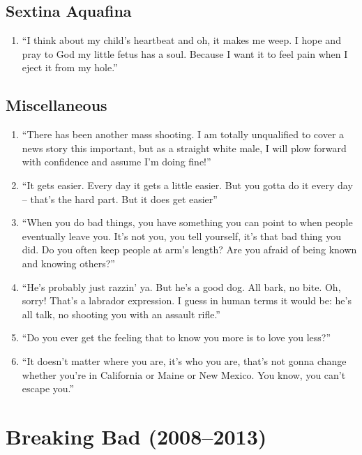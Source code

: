 \documentclass{book}
\numberwithin{equation}{section}
\begin{document}
\section{Sextina Aquafina}
\begin{enumerate}
    \item ``I think about my child's heartbeat and oh, it makes me weep. I hope and pray to God my little fetus has a soul. Because I want it to feel pain when I eject it from my hole.''
\end{enumerate}

\section{Miscellaneous}
\begin{enumerate}
    \item ``There has been another mass shooting. I am totally unqualified to cover a news story this important, but as a straight white male, I will plow forward with confidence and assume I'm doing fine!''
    \item ``It gets easier. Every day it gets a little easier. But you gotta do it every day -- that's the hard part. But it does get easier''
    \item ``When you do bad things, you have something you can point to when people eventually leave you. It's not you, you tell yourself, it's that bad thing you did. Do you often keep people at arm's length? Are you afraid of being known and knowing others?''
    \item ``He's probably just razzin' ya. But he's a good dog. All bark, no bite. Oh, sorry! That's a labrador expression. I guess in human terms it would be: he's all talk, no shooting you with an assault rifle.''
    \item ``Do you ever get the feeling that to know you more is to love you less?''
    \item ``It doesn't matter where you are, it's who you are, that's not gonna change whether you're in California or Maine or New Mexico. You know, you can't escape you.''
\end{enumerate}


\chapter{Breaking Bad (2008--2013)}
\end{document}
